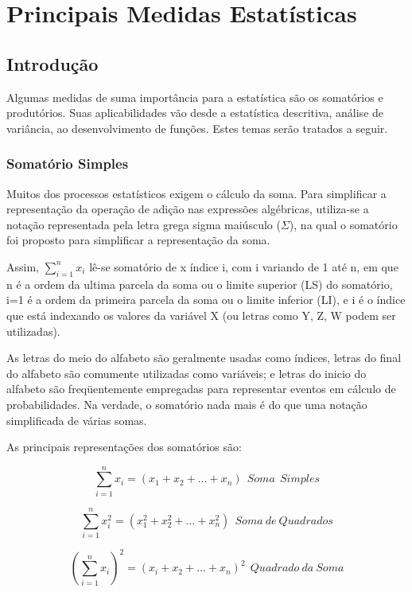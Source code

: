 \chapter{Principais Medidas Estatísticas}

\section{Introdução}

Algumas medidas de suma importância para a estatística são os somatórios e produtórios. Suas aplicabilidades vão desde a estatística descritiva, análise de variância, ao desenvolvimento de funções. Estes temas serão tratados a seguir.


\subsection{Somatório Simples}

\inic Muitos dos processos estatísticos exigem o cálculo da soma. Para simplificar a representação da operação de adição nas expressões algébricas, utiliza-se a notação representada pela letra grega sigma maiúsculo ($\Sigma$), na qual o somatório foi proposto para simplificar a representação da soma.\vskip0.3cm


Assim, $\sum_{i=1}^{n}x_{i}$  lê-se  somatório de x índice i, com i variando de 1 até n, em que n é a ordem da ultima parcela da soma ou o limite superior (LS) do somatório, i=1 é a ordem da primeira parcela da soma ou o limite inferior (LI), e i é o índice que está indexando os valores da variável  X (ou letras como Y, Z, W podem ser utilizadas).\vskip0.3cm

As letras do meio do alfabeto são geralmente usadas como índices, letras do final do alfabeto são comumente utilizadas como variáveis; e letras do inicio do alfabeto são freqüentemente empregadas para representar eventos em cálculo de probabilidades. Na verdade, o somatório nada mais é do que uma notação simplificada de várias somas.\vskip0.3cm

As principais representações dos somatórios são:


$$\sum_{i=1}^{n}x_{i} = (x_{1}+x_{2}+\ldots+x_{n}) \ \ Soma \ \ Simples $$

$$\sum_{i=1}^{n}x_{i}^{2} = (x_{1}^{2}+x_{2}^{2}+\ldots+x_{n}^{2}) \ \ Soma \ de \ Quadrados$$


$$ \left(\sum_{i=1}^{n}x_{i}\right)^{2}=(x_{i}+x_{2}+\ldots+x_{n})^{2} \ \ Quadrado \ da \ Soma$$

